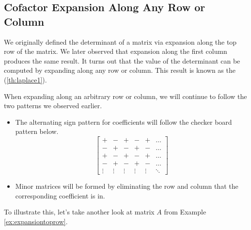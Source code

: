 \documentclass{ximera}
\begin{document}
\subsection*{Cofactor Expansion Along Any Row or Column}

We originally defined the determinant of a matrix via expansion along the top row of the matrix.  We later observed that expansion along the first column produces the same result.  It turns out that the value of the determinant can be computed by expanding along any row or column.  This result is known as the  (\ref{th:laplace1}).

When expanding along an arbitrary row or column, we will continue to follow the two patterns we observed earlier.
\begin{itemize}
    \item The alternating sign pattern for coefficients will follow the checker board pattern below.
 $$\begin{bmatrix}+&-&+&-&+&\ldots\\-&+&-&+&-&\ldots\\
 +&-&+&-&+&\ldots\\-&+&-&+&-&\ldots\\\vdots &\vdots  & \vdots & \vdots &\vdots &\ddots \end{bmatrix}$$
 \item Minor matrices will be formed by eliminating the row and column that the corresponding coefficient is in.
\end{itemize}

To illustrate this, let's take another look at matrix $A$ from Example \ref{ex:expansiontoprow}. 
\end{document}
